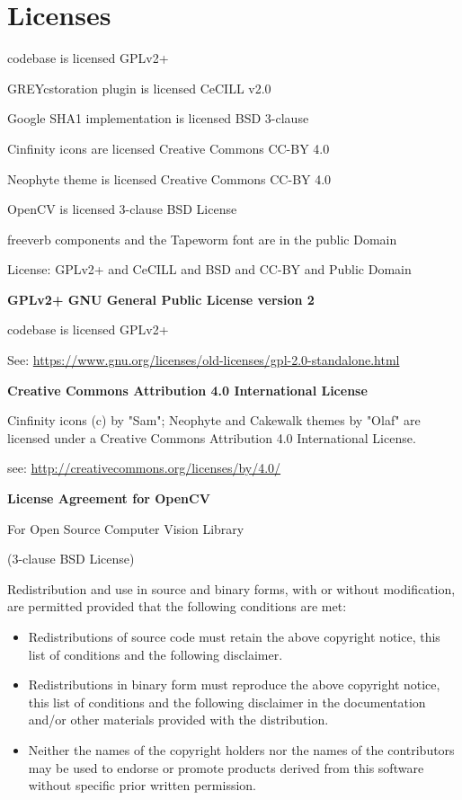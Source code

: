 \chapter{Licenses}%
\label{cha:licenses}

\CGG{} codebase is licensed GPLv2+

GREYcstoration plugin is licensed CeCILL v2.0

Google SHA1 implementation is licensed BSD 3-clause

Cinfinity icons are licensed Creative Commons CC-BY 4.0

Neophyte theme is licensed Creative Commons CC-BY 4.0

OpenCV is licensed 3-clause BSD License

freeverb components and the Tapeworm font are in the public Domain

License: GPLv2+ and CeCILL and BSD and CC-BY and Public Domain

\vspace{2ex} \textbf{GPLv2+ \qquad   GNU General Public License version 2}

\CGG{} codebase is licensed GPLv2+ 

See: {\small \url{https://www.gnu.org/licenses/old-licenses/gpl-2.0-standalone.html }}

\vspace{2ex} \textbf{Creative Commons Attribution 4.0 International License}

Cinfinity icons (c) by "Sam"; Neophyte and Cakewalk themes by "Olaf" are licensed under a
Creative Commons Attribution 4.0 International License.

see: {\small \url{http://creativecommons.org/licenses/by/4.0/}}

\vspace{2ex} \textbf{License Agreement for OpenCV}

\begin{center}
For Open Source Computer Vision Library

(3-clause BSD License)
\end{center}

Redistribution and use in source and binary forms, with or without modification, are permitted provided that the following conditions are met:

\begin{itemize}
	\item Redistributions of source code must retain the above copyright notice, this list of conditions and the following disclaimer.
	\item Redistributions in binary form must reproduce the above copyright notice, this list of conditions and the following disclaimer in the documentation and/or other materials provided with the distribution.
	\item Neither the names of the copyright holders nor the names of the contributors may be used to endorse or promote products derived from this software without specific prior written permission.
\end{itemize}

